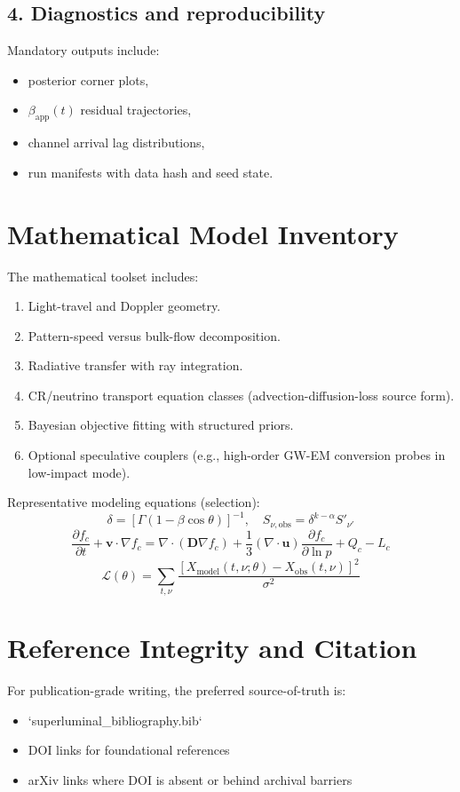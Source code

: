 \documentclass[11pt, oneside]{book}
\begin{document}
\section{4. Diagnostics and reproducibility}
Mandatory outputs include:
\begin{itemize}
  \item posterior corner plots,
  \item \(\beta_{\mathrm{app}}(t)\) residual trajectories,
  \item channel arrival lag distributions,
  \item run manifests with data hash and seed state.
\end{itemize}

\chapter{Mathematical Model Inventory}
The mathematical toolset includes:
\begin{enumerate}
  \item Light-travel and Doppler geometry.
  \item Pattern-speed versus bulk-flow decomposition.
  \item Radiative transfer with ray integration.
  \item CR/neutrino transport equation classes (advection-diffusion-loss source form).
  \item Bayesian objective fitting with structured priors.
  \item Optional speculative couplers (e.g., high-order GW-EM conversion probes in low-impact mode).
\end{enumerate}

Representative modeling equations (selection):
\[
\delta=[\Gamma(1-\beta\cos\theta)]^{-1},\quad
S_{\nu,\mathrm{obs}}=\delta^{k-\alpha}S'_{\nu'}
\]
\[
\frac{\partial f_c}{\partial t}+\mathbf v\cdot\nabla f_c=
\nabla\cdot(\mathbf D\nabla f_c)+\frac13(\nabla\cdot\mathbf u)\frac{\partial f_c}{\partial\ln p}+Q_c-L_c
\]
\[
\mathcal L(\theta)=\sum_{t,\nu}\frac{\left[X_{\mathrm{model}}(t,\nu;\theta)-X_{\mathrm{obs}}(t,\nu)\right]^2}{\sigma^2}
\]

\chapter{Reference Integrity and Citation}
For publication-grade writing, the preferred source-of-truth is:
\begin{itemize}
  \item `superluminal_bibliography.bib`
  \item DOI links for foundational references
  \item arXiv links where DOI is absent or behind archival barriers
\end{itemize}

\printbibliography
\end{document}
